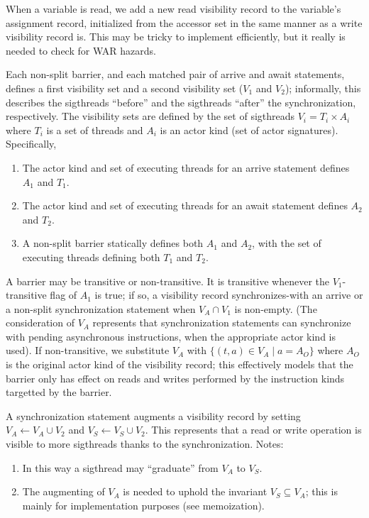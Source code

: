 \filbreak
{} When a variable is read, we add a new read visibility record to the variable's assignment record, initialized from the accessor set in the same manner as a write visibility record is.
This may be tricky to implement efficiently, but it really is needed to check for WAR hazards.

\filbreak
{} Each non-split barrier, and each matched pair of arrive and await statements, defines a first visibility set and a second visibility set ($V_1$ and $V_2$); informally, this describes the sigthreads ``before'' and the sigthreads ``after'' the synchronization, respectively.
The visibility sets are defined by the set of sigthreads $V_i = T_i \times A_i$ where $T_i$ is a set of threads and $A_i$ is an actor kind (set of actor signatures).
Specifically,

\filbreak
\begin{enumerate}
  \item The actor kind and set of executing threads for an arrive statement defines $A_1$ and $T_1$.
  \item The actor kind and set of executing threads for an await statement defines $A_2$ and $T_2$.
  \item A non-split barrier statically defines both $A_1$ and $A_2$, with the set of executing threads defining both $T_1$ and $T_2$.
\end{enumerate}

\filbreak
A barrier may be transitive or non-transitive.
It is transitive whenever the $V_1$-transitive flag of $A_1$ is true; if so, a visibility record synchronizes-with an arrive or a non-split synchronization statement when ${V_A \cap V_1}$ is non-empty.
(The consideration of $V_A$ represents that synchronization statements can synchronize with pending asynchronous instructions, when the appropriate actor kind is used).
If non-transitive, we substitute $V_A$ with ${\{ (t, a) \in V_A \mid a = A_O \}}$ where $A_O$ is the original actor kind of the visibility record; this effectively models that the barrier only has effect on reads and writes performed by the instruction kinds targetted by the barrier.

\filbreak
A synchronization statement augments a visibility record by setting ${V_A \leftarrow V_A \cup V_2}$ and ${V_S \leftarrow V_S \cup V_2}$.
This represents that a read or write operation is visible to more sigthreads thanks to the synchronization.
Notes:
\begin{enumerate}
  \item In this way a sigthread may ``graduate'' from $V_A$ to $V_S$.
  \item The augmenting of $V_A$ is needed to uphold the invariant $V_S \subseteq V_A$; this is mainly for implementation purposes (see memoization).
\end{enumerate}

